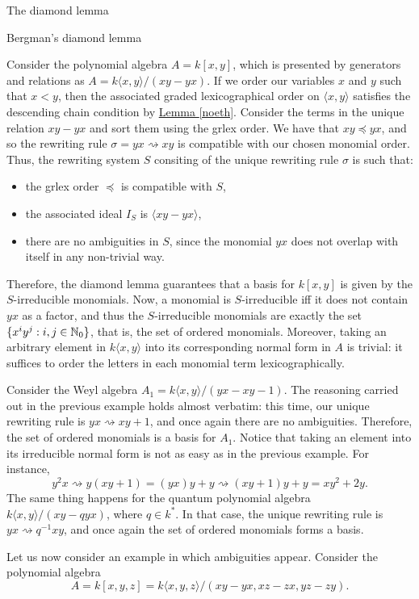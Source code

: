 \begin{chapter}{The diamond lemma}
\begin{section}{Bergman's diamond lemma}
\begin{exmp} Consider the polynomial algebra $A=k[x,y]$, which is presented by generators and relations as $A=k\langle x,y\rangle/(xy-yx)$. If we order our variables $x$ and $y$ such that $x<y$, then the associated graded lexicographical order on $\langle x,y\rangle$ satisfies the descending chain condition by \hyperref[noeth]{Lemma \ref*{noeth}}. Consider the terms in the unique relation $xy-yx$ and sort them using the grlex order. We have that $xy\preceq yx$, and so the rewriting rule $\sigma=yx\rightsquigarrow xy$ is compatible with our chosen monomial order. Thus, the rewriting system $S$ consiting of the unique rewriting rule $\sigma$ is such that:
\begin{itemize}
\item the grlex order $\preceq$ is compatible with $S$,
\item the associated ideal $I_S$ is $\langle xy-yx\rangle$,
\item there are no ambiguities in $S$, since the monomial $yx$ does not overlap with itself in any non-trivial way.
\end{itemize}
Therefore, the diamond lemma guarantees that a basis for $k[x,y]$ is given by the $S$-irreducible monomials. Now, a monomial is $S$-irreducible iff it does not contain $yx$ as a factor, and thus the $S$-irreducible monomials are exactly the set $\{x^iy^j:i,j\in\mathbb{N}_0\}$, that is, the set of ordered monomials.
Moreover, taking an arbitrary element in $k\langle x,y\rangle$ into its corresponding normal form in $A$ is trivial: it suffices to order the letters in each monomial term lexicographically.
\end{exmp}
\begin{exmp} Consider the Weyl algebra $A_1 = k\langle x,y\rangle/(yx-xy-1)$. The reasoning carried out in the previous example holds almost verbatim: this time, our unique rewriting rule is $yx\rightsquigarrow xy + 1$, and once again there are no ambiguities. Therefore, the set of ordered monomials is a basis for $A_1$. Notice that taking an element into its irreducible normal form is not as easy as in the previous example. For instance, 
\[y^2x\rightsquigarrow y(xy+1) = (yx)y +y \rightsquigarrow (xy+1)y + y =xy^2 +2y.\]
The same thing happens for the quantum polynomial algebra $k\langle x,y\rangle/(xy-qyx)$, where $q\in k^*$. In that case, the unique rewriting rule is $yx\rightsquigarrow q^{-1}xy$, and once again the set of ordered monomials forms a basis.
\end{exmp}
\begin{exmp} Let us now consider an example in which ambiguities appear. Consider the polynomial algebra \[A=k[x,y,z]=k\langle x,y,z\rangle/(xy-yx, xz-zx, yz-zy).\]

\end{exmp}
\end{section}
\end{chapter}
